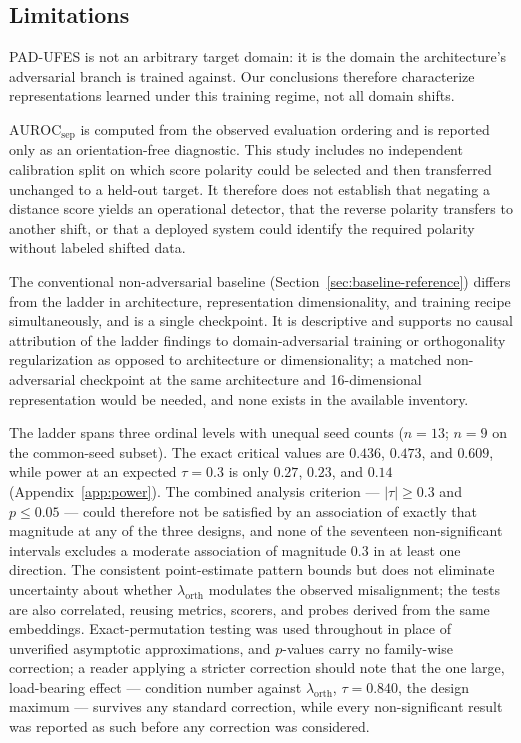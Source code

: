\subsection{Limitations}
\label{sec:limitations}

PAD-UFES is not an arbitrary target domain: it is the domain the architecture's adversarial branch is trained against. Our conclusions therefore characterize representations learned under this training regime, not all domain shifts.

$\mathrm{AUROC}_{\mathrm{sep}}$ is computed from the observed evaluation ordering and is reported only as an orientation-free diagnostic. This study includes no independent calibration split on which score polarity could be selected and then transferred unchanged to a held-out target. It therefore does not establish that negating a distance score yields an operational detector, that the reverse polarity transfers to another shift, or that a deployed system could identify the required polarity without labeled shifted data.

The conventional non-adversarial baseline (Section~\ref{sec:baseline-reference}) differs from the ladder in architecture, representation dimensionality, and training recipe simultaneously, and is a single checkpoint. It is descriptive and supports no causal attribution of the ladder findings to domain-adversarial training or orthogonality regularization as opposed to architecture or dimensionality; a matched non-adversarial checkpoint at the same architecture and 16-dimensional representation would be needed, and none exists in the available inventory.

The ladder spans three ordinal levels with unequal seed counts ($n = 13$; $n = 9$ on the common-seed subset). The exact critical values are $0.436$, $0.473$, and $0.609$, while power at an expected $\tau = 0.3$ is only $0.27$, $0.23$, and $0.14$ (Appendix~\ref{app:power}). The combined analysis criterion --- $|\tau| \geq 0.3$ and $p \leq 0.05$ --- could therefore not be satisfied by an association of exactly that magnitude at any of the three designs, and none of the seventeen non-significant intervals excludes a moderate association of magnitude $0.3$ in at least one direction. The consistent point-estimate pattern bounds but does not eliminate uncertainty about whether $\lambda_{\mathrm{orth}}$ modulates the observed misalignment; the tests are also correlated, reusing metrics, scorers, and probes derived from the same embeddings. Exact-permutation testing was used throughout in place of unverified asymptotic approximations, and $p$-values carry no family-wise correction; a reader applying a stricter correction should note that the one large, load-bearing effect --- condition number against $\lambda_{\mathrm{orth}}$, $\tau = 0.840$, the design maximum --- survives any standard correction, while every non-significant result was reported as such before any correction was considered.

